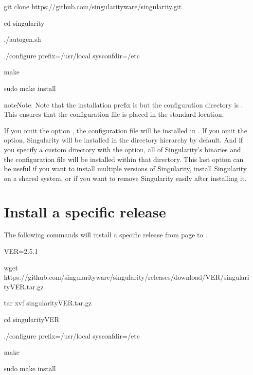 \documentclass[letterpaper,10pt,english]{sphinxmanual}
\begin{document}
%
\begin{sphinxVerbatim}[commandchars=\\\{\}]
\PYGZdl{} git clone https://github.com/singularityware/singularity.git

\PYGZdl{} cd singularity

\PYGZdl{} ./autogen.sh

\PYGZdl{} ./configure \PYGZhy{}\PYGZhy{}prefix=/usr/local \PYGZhy{}\PYGZhy{}sysconfdir=/etc

\PYGZdl{} make

\PYGZdl{} sudo make install
\end{sphinxVerbatim}

\begin{sphinxadmonition}{note}{Note:}
Note that the installation prefix is  but the configuration directory
is . This ensures that the configuration file  is placed in the
standard location.
\end{sphinxadmonition}

If you omit the  option , the configuration file will be installed in .
If you omit the  option, Singularity will be installed in the  directory
hierarchy by default. And if you specify a custom directory with the 
option, all of Singularity’s binaries and the configuration file will
be installed within that directory. This last option can be useful if
you want to install multiple versions of Singularity, install
Singularity on a shared system, or if you want to remove Singularity
easily after installing it.


\section{Install a specific release}
\label{\detokenize{installation:install-a-specific-release}}
The following commands will install a specific release from  page to .

%
\begin{sphinxVerbatim}[commandchars=\\\{\}]
\PYGZdl{} VER=2.5.1

\PYGZdl{} wget https://github.com/singularityware/singularity/releases/download/\PYGZdl{}VER/singularity\PYGZhy{}\PYGZdl{}VER.tar.gz

\PYGZdl{} tar xvf singularity\PYGZhy{}\PYGZdl{}VER.tar.gz

\PYGZdl{} cd singularity\PYGZhy{}\PYGZdl{}VER

\PYGZdl{} ./configure \PYGZhy{}\PYGZhy{}prefix=/usr/local \PYGZhy{}\PYGZhy{}sysconfdir=/etc

\PYGZdl{} make

\PYGZdl{} sudo make install
\end{sphinxVerbatim}
\end{document}

